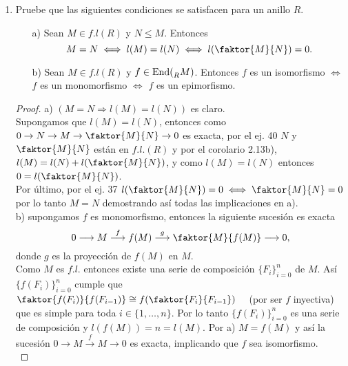 \documentclass{article}
\begin{document}
\begin{enumerate}[label=\textbf{Ej \arabic*.}]
\begin{proof}
			Ahora, dado que $f$ es un monomorfismo, se tiene que $B_{t} \cong A_{t}$, para $t \leq n$. Y por otro lado, el teorema de la correspondencia y el tercer teorema de isomorfismo garantizan que $\displaystyle\frac{B_{t+1}}{B_{t}} = \displaystyle\frac{g^{-1}(C_{t+1})}{g^{-1}(C_{t})} \cong \displaystyle\frac{C_{t-n+1}}{C_{t-n}}$ para cada $n+1 \leq t \leq n+m$. Más aún, tenemos que los cocientes $\displaystyle\frac{B_{t+1}}{B_{t}}$ son simples, toda vez que los cocientes $\displaystyle\frac{A_{i+1}}{A_{i}}$ y $\displaystyle\frac{C_{j+1}}{C_{j}}$ lo son. De esta forma $\mathfrak{B}$ es una serie de composición para $B$. $\therefore B \in f.l.\lrprth{R}$
		\end{proof}
		
		
		\item Pruebe que las siguientes condiciones se satisfacen para un anillo $R$.\\
		\begin{itemize}
			\item[a)] Sean $M\in f.l(R)$ y $N\leq M$. Entonces 
			\[M=N\iff l(M)=l(N)\iff l(\faktor{M}{N})=0.\]
			\item[b)] Sean $M\in f.l(R)$ y $f\in \operatorname{End}(\prescript{}{R}{M})$. Entonces $f$ es un isomorfismo $\iff$ $f$ es un 
			monomorfismo $\iff$ $f$ es un epimorfismo.
		\end{itemize}
		\begin{proof}
			a) $\left(M=N\Rightarrow l(M)=l(N)\right)$ es claro.\\
			Supongamos que $l(M)=l(N)$, entonces como $0\to N\to M\to \faktor{M}{N}\to 0$ es exacta, por el ej. 40 $N$ y $\faktor{M}{N}$ están en $f.l.(R)$
			y por el corolario 2.13b), $l(M)=l(N)+l(\faktor{M}{N})$, y como $l(M)=l(N)$ entonces $0=l(\faktor{M}{N})$.\\
			Por último, por el ej. 37      $l(\faktor{M}{N})=0\iff \faktor{M}{N}=0$ por lo tanto $M=N$ demostrando así  todas las implicaciones en a).\\
			
			b) supongamos $f$ es monomorfismo, entonces la siguiente sucesión es exacta 
			\[0\longrightarrow M \stackrel{f}{\longrightarrow} f(M) \stackrel{g}{\longrightarrow} \faktor{M}{f(M)}\longrightarrow 0,\]
			donde $g$ es la proyección de $f(M)$ en $M$.\\
			
			Como $M$ es $f.l.$ entonces existe una serie de composición $\{F_i\}_{i=0}^n$ de $M$. Así $\{f(F_i)\}_{i=0}^n$ cumple que \quad
			$\faktor{f(F_i)}{f(F_{i-1})}\cong f(\faktor{F_i}{F_{i-1}})\quad$ (por ser $f$ inyectiva) que es simple para toda $i\in \{1,\ldots, n\}$.
			Por lo tanto $\{f(F_i)\}_{i=0}^n$ es una serie de composición y $l(f(M))=n=l(M)$. Por a) $M=f(M)$ y así la sucesión 
			$0\longrightarrow M \stackrel{f}{\longrightarrow} M\longrightarrow 0 $ es exacta, implicando que $f$ sea isomorfismo.\\
			

\end{proof}
\end{enumerate}
\end{document}
